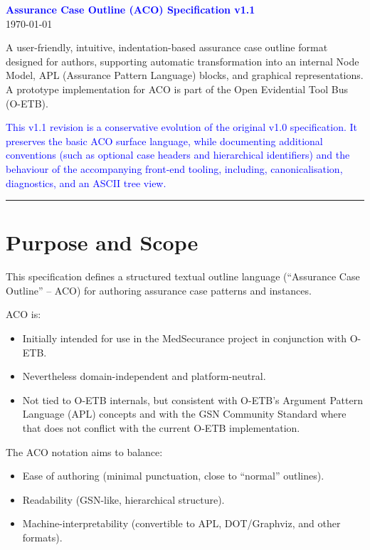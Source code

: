 \documentclass[11pt]{article}
\begin{document}
\begin{center}
{\LARGE \textbf{\textcolor{blue}{Assurance Case Outline (ACO) Specification v1.1}}}\\[0.5em]
\today
\end{center}

A user-friendly, intuitive, indentation-based assurance case outline format designed for authors, supporting automatic transformation into an internal Node Model, APL (Assurance Pattern Language) blocks, and graphical representations.
A prototype implementation for ACO is part of the Open Evidential Tool Bus (O-ETB).

\textcolor{blue}{This v1.1 revision is a conservative evolution of the original v1.0 specification. It preserves the basic ACO surface language, while documenting additional conventions (such as optional case headers and hierarchical identifiers) and the behaviour of the accompanying front-end tooling, including, canonicalisation, diagnostics, and an ASCII tree view.}

\bigskip
\hrule
\bigskip

\section{Purpose and Scope}

This specification defines a structured textual outline language (``Assurance Case Outline'' -- ACO) for authoring assurance case patterns and instances.

ACO is:
\begin{itemize}[leftmargin=2em]
  \item Initially intended for use in the MedSecurance project in conjunction with O-ETB.
  \item Nevertheless domain-independent and platform-neutral.
  \item Not tied to O-ETB internals, but consistent with O-ETB's Argument Pattern Language (APL) concepts and with the GSN Community Standard where that does not conflict with the current O-ETB implementation.
\end{itemize}

The ACO notation aims to balance:
\begin{itemize}[leftmargin=2em]
  \item Ease of authoring (minimal punctuation, close to ``normal'' outlines).
  \item Readability (GSN-like, hierarchical structure).
  \item Machine-interpretability (convertible to APL, DOT/Graphviz, and other formats).
\end{itemize}
\end{document}
